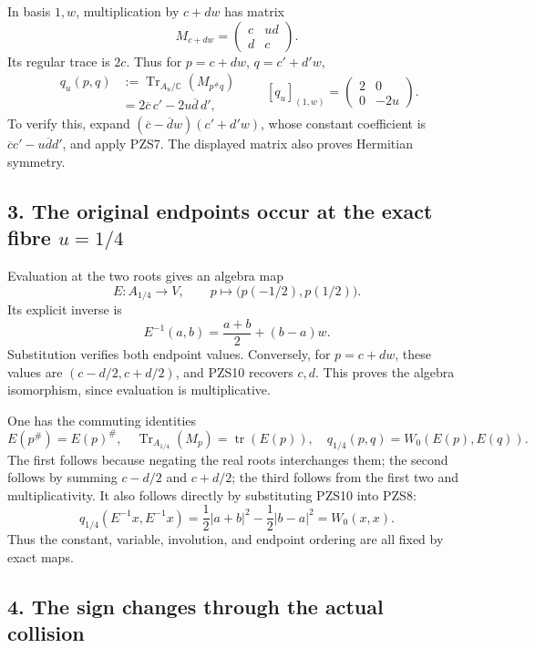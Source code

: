 \documentclass[
  10pt,
  a4paper,
]{article}
\begin{document}
In basis \(1,w\), multiplication by \(c+dw\) has matrix \[
M_{c+dw}=\begin{pmatrix}c&ud\\d&c\end{pmatrix}.
\tag{PZS7}
\] Its regular trace is \(2c\). Thus for \(p=c+dw\), \(q=c'+d'w\), \[
\begin{aligned}
q_u(p,q)&:=\operatorname{Tr}_{A_u/\mathbb C}(M_{p^\#q})\\
&=2\overline c\,c'-2u\overline d\,d',
\end{aligned}
\qquad
[q_u]_{(1,w)}=\begin{pmatrix}2&0\\0&-2u\end{pmatrix}.
\tag{PZS8}
\] To verify this, expand \((\overline c-\overline d w)(c'+d'w)\), whose
constant coefficient is \(\overline c c'-u\overline d d'\), and apply
PZS7. The displayed matrix also proves Hermitian symmetry.

\subsection{\texorpdfstring{3. The original endpoints occur at the exact
fibre
\(u=1/4\)}{3. The original endpoints occur at the exact fibre u=1/4}}\label{the-original-endpoints-occur-at-the-exact-fibre-u14}

Evaluation at the two roots gives an algebra map \[
E:A_{1/4}\longrightarrow V,\qquad
p\longmapsto\bigl(p(-1/2),p(1/2)\bigr).
\tag{PZS9}
\] Its explicit inverse is \[
E^{-1}(a,b)=\frac{a+b}{2}+(b-a)w.
\tag{PZS10}
\] Substitution verifies both endpoint values. Conversely, for
\(p=c+dw\), these values are \((c-d/2,c+d/2)\), and PZS10 recovers
\(c,d\). This proves the algebra isomorphism, since evaluation is
multiplicative.

One has the commuting identities \[
E(p^\#)=E(p)^\#,
\quad \operatorname{Tr}_{A_{1/4}}(M_p)=\operatorname{tr}(E(p)),
\quad q_{1/4}(p,q)=W_0(E(p),E(q)).
\tag{PZS11}
\] The first follows because negating the real roots interchanges them;
the second follows by summing \(c-d/2\) and \(c+d/2\); the third follows
from the first two and multiplicativity. It also follows directly by
substituting PZS10 into PZS8: \[
q_{1/4}(E^{-1}x,E^{-1}x)
=\frac12|a+b|^2-\frac12|b-a|^2=W_0(x,x).
\tag{PZS12}
\] Thus the constant, variable, involution, and endpoint ordering are
all fixed by exact maps.

\subsection{4. The sign changes through the actual
collision}\label{the-sign-changes-through-the-actual-collision}
\end{document}
